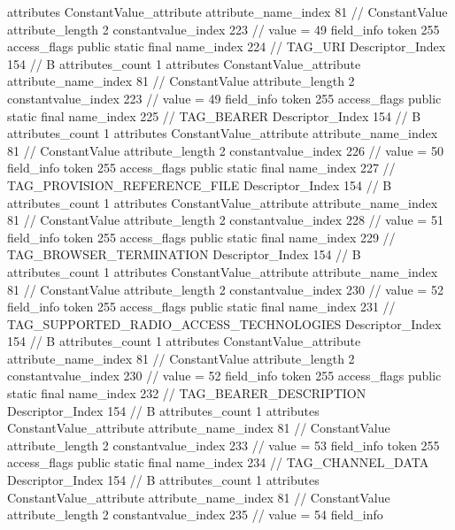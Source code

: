{{{{{				attributes {
				ConstantValue_attribute {
					attribute_name_index	81		// ConstantValue
					attribute_length	2
					constantvalue_index	223		// value = 49
				}
				}
			}
			field_info {
				token	255
				access_flags	public static final
				name_index	224		// TAG_URI
				Descriptor_Index	154		// B
				attributes_count	1
				attributes {
				ConstantValue_attribute {
					attribute_name_index	81		// ConstantValue
					attribute_length	2
					constantvalue_index	223		// value = 49
				}
				}
			}
			field_info {
				token	255
				access_flags	public static final
				name_index	225		// TAG_BEARER
				Descriptor_Index	154		// B
				attributes_count	1
				attributes {
				ConstantValue_attribute {
					attribute_name_index	81		// ConstantValue
					attribute_length	2
					constantvalue_index	226		// value = 50
				}
				}
			}
			field_info {
				token	255
				access_flags	public static final
				name_index	227		// TAG_PROVISION_REFERENCE_FILE
				Descriptor_Index	154		// B
				attributes_count	1
				attributes {
				ConstantValue_attribute {
					attribute_name_index	81		// ConstantValue
					attribute_length	2
					constantvalue_index	228		// value = 51
				}
				}
			}
			field_info {
				token	255
				access_flags	public static final
				name_index	229		// TAG_BROWSER_TERMINATION
				Descriptor_Index	154		// B
				attributes_count	1
				attributes {
				ConstantValue_attribute {
					attribute_name_index	81		// ConstantValue
					attribute_length	2
					constantvalue_index	230		// value = 52
				}
				}
			}
			field_info {
				token	255
				access_flags	public static final
				name_index	231		// TAG_SUPPORTED_RADIO_ACCESS_TECHNOLOGIES
				Descriptor_Index	154		// B
				attributes_count	1
				attributes {
				ConstantValue_attribute {
					attribute_name_index	81		// ConstantValue
					attribute_length	2
					constantvalue_index	230		// value = 52
				}
				}
			}
			field_info {
				token	255
				access_flags	public static final
				name_index	232		// TAG_BEARER_DESCRIPTION
				Descriptor_Index	154		// B
				attributes_count	1
				attributes {
				ConstantValue_attribute {
					attribute_name_index	81		// ConstantValue
					attribute_length	2
					constantvalue_index	233		// value = 53
				}
				}
			}
			field_info {
				token	255
				access_flags	public static final
				name_index	234		// TAG_CHANNEL_DATA
				Descriptor_Index	154		// B
				attributes_count	1
				attributes {
				ConstantValue_attribute {
					attribute_name_index	81		// ConstantValue
					attribute_length	2
					constantvalue_index	235		// value = 54
				}
				}
			}
			field_info {
}}}}}
